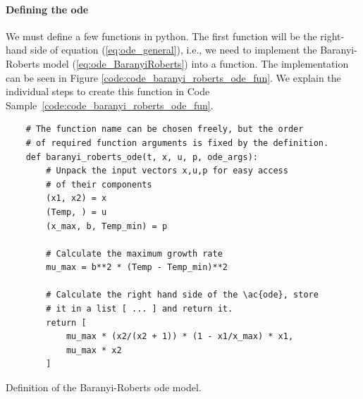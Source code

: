 \documentclass[graybox]{svmult}
\begin{document}
\paragraph{Defining the \acs{ode}}
We must define a few functions in python.
The first function will be the right-hand side of equation (\ref{eq:ode_general}), i.e., we need to implement the Baranyi-Roberts model (\ref{eq:ode_BaranyiRoberts}) into a function.
The implementation can be seen in Figure \ref{code:code_baranyi_roberts_ode_fun}.
We explain the individual steps to create this function in Code Sample~\ref{code:code_baranyi_roberts_ode_fun}.
\begin{code}[h]
    \begin{verbatim}
    # The function name can be chosen freely, but the order
    # of required function arguments is fixed by the definition.
    def baranyi_roberts_ode(t, x, u, p, ode_args):
        # Unpack the input vectors x,u,p for easy access
        # of their components
        (x1, x2) = x
        (Temp, ) = u
        (x_max, b, Temp_min) = p

        # Calculate the maximum growth rate
        mu_max = b**2 * (Temp - Temp_min)**2

        # Calculate the right hand side of the \ac{ode}, store
        # it in a list [ ... ] and return it.
        return [
            mu_max * (x2/(x2 + 1)) * (1 - x1/x_max) * x1,
            mu_max * x2
        ]
    \end{verbatim}
    \caption{
        Definition of the Baranyi-Roberts \ac{ode} model.
    }
    \label{code:code_baranyi_roberts_ode_fun}
\end{code}
%
\end{document}
